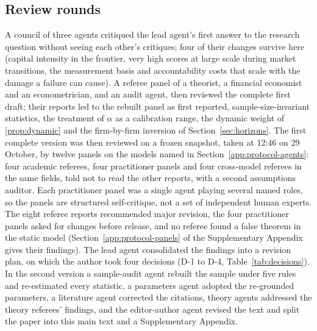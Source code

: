 \subsection{Review rounds}\label{app:protocol-rounds}
A council of three agents critiqued the lead agent's first answer to the research question without seeing each other's critiques; four of their changes survive here (capital intensity in the frontier, very high scores at large scale during market transitions, the measurement basis and accountability costs that scale with the damage a failure can cause). A referee panel of a theorist, a financial economist and an econometrician, and an audit agent, then reviewed the complete first draft; their reports led to the rebuilt panel as first reported, sample-size-invariant statistics, the treatment of $\alpha$ as a calibration range, the dynamic weight of \autoref{prop:dynamic} and the firm-by-firm inversion of Section~\ref{sec:horizons}. The first complete version was then reviewed on a frozen snapshot, taken at 12:46 on 29 October, by twelve panels on the models named in Section~\ref{app:protocol-agents}: four academic referees, four practitioner panels and four cross-model referees in the same fields, told not to read the other reports, with a second assumptions auditor. Each practitioner panel was a single agent playing several named roles, so the panels are structured self-critique, not a set of independent human experts. The eight referee reports recommended major revision, the four practitioner panels asked for changes before release, and no referee found a false theorem in the static model (Section~\ref{app:protocol-panels} of the Supplementary Appendix gives their findings). The lead agent consolidated the findings into a revision plan, on which the author took four decisions (D-1 to D-4, Table~\ref{tab:decisions}). In the second version a sample-audit agent rebuilt the sample under five rules and re-estimated every statistic, a parameters agent adopted the re-grounded parameters, a literature agent corrected the citations, theory agents addressed the theory referees' findings, and the editor-author agent revised the text and split the paper into this main text and a Supplementary Appendix.

